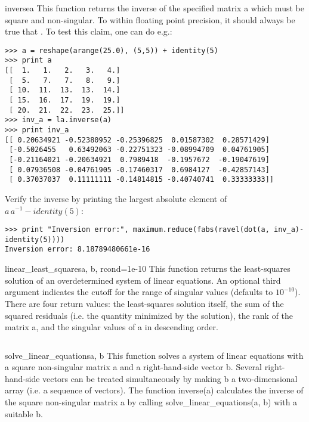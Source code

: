 \begin{funcdesc}{inverse}{a}
   This function returns the inverse of the specified matrix a which must be
   square and non-singular. To within floating point precision, it should
   always be true that .  To test this claim, one can do e.g.:
\begin{verbatim}
>>> a = reshape(arange(25.0), (5,5)) + identity(5)
>>> print a
[[  1.   1.   2.   3.   4.]
 [  5.   7.   7.   8.   9.]
 [ 10.  11.  13.  13.  14.]
 [ 15.  16.  17.  19.  19.]
 [ 20.  21.  22.  23.  25.]]
>>> inv_a = la.inverse(a)
>>> print inv_a
[[ 0.20634921 -0.52380952 -0.25396825  0.01587302  0.28571429]
 [-0.5026455   0.63492063 -0.22751323 -0.08994709  0.04761905]
 [-0.21164021 -0.20634921  0.7989418  -0.1957672  -0.19047619]
 [ 0.07936508 -0.04761905 -0.17460317  0.6984127  -0.42857143]
 [ 0.37037037  0.11111111 -0.14814815 -0.40740741  0.33333333]]
\end{verbatim}
   Verify the inverse by printing the largest absolute element of
   $a\, a^{-1} - identity(5)$:
\begin{verbatim}
>>> print "Inversion error:", maximum.reduce(fabs(ravel(dot(a, inv_a)-identity(5))))
Inversion error: 8.18789480661e-16
\end{verbatim}
\end{funcdesc}
 
\begin{funcdesc}{linear_least_squares}{a, b, rcond=1e-10}
   This function returns the least-squares solution of an overdetermined system
   of linear equations. An optional third argument indicates the cutoff for the
   range of singular values (defaults to $10^{-10}$). There are four return
   values: the least-squares solution itself, the sum of the squared residuals
   (i.e.  the quantity minimized by the solution), the rank of the matrix a,
   and the singular values of a in descending order.
\begin{verbatim}

\end{verbatim}
\end{funcdesc}
 
\begin{funcdesc}{solve_linear_equations}{a, b}
   This function solves a system of linear equations with a square non-singular
   matrix a and a right-hand-side vector b. Several right-hand-side vectors can
   be treated simultaneously by making b a two-dimensional array (i.e. a
   sequence of vectors). The function inverse(a) calculates the inverse of the
   square non-singular matrix a by calling solve_linear_equations(a, b) with a
   suitable b.
\end{funcdesc}
 
